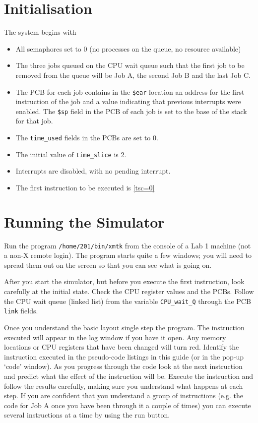 \documentclass[a4paper,10pt]{article}
\begin{document}
\section{Initialisation}
The system begins with 
\begin{itemize}
\setlength{\itemsep}{0cm}

\item All semaphores set to 0 (no processes on the queue, no resource
available)

\item The three jobs queued on the CPU wait queue such that the first
job to be removed from the queue will be Job A, the second Job B and
the last Job C.

\item The PCB for each job contains in the \texttt{\$ear} location an
address for the first instruction of the job and a value indicating
that previous interrupts were enabled.  The \texttt{\$sp} field in the
PCB of each job is set to the base of the stack for that job.

\item The \texttt{time\_used} fields in the PCBs are set to 0.

\item The initial value of \texttt{time\_slice} is 2.

\item Interrupts are disabled, with no pending interrupt.

\item The first instruction to be executed is \ref{tsc=0}
\end{itemize}


\section{Running the Simulator}

Run the program \verb+/home/201/bin/xmtk+ from the console of a Lab 1
machine (not a non-X remote login).  The program starts quite a few
windows; you will need to spread them out on the screen so that you
can see what is going on.

After you start the simulator, but before you execute the first
instruction, look carefully at the initial state.  Check the CPU
register values and the PCBs.  Follow the CPU wait queue (linked list)
from the variable \texttt{CPU\_wait\_Q} through the PCB \texttt{link}
fields.

Once you understand the basic layout single step the program. The
instruction executed will appear in the log window if you have it
open.  Any memory locations or CPU registers that have been changed
will turn red.  Identify the instruction executed in the pseudo-code
listings in this guide (or in the pop-up `code' window).  As you
progress through the code look at the next instruction and predict
what the effect of the instruction will be.  Execute the instruction
and follow the results carefully, making sure you understand what
happens at each step.  If you are confident that you understand a
group of instructions (e.g. the code for Job A once you have been
through it a couple of times) you can execute several instructions at
a time by using the run button.
\end{document}
